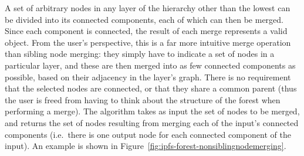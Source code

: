 A set of arbitrary nodes in any layer of the hierarchy other than the lowest can be divided into its connected components, each of which can then be merged. Since each component is connected, the result of each merge represents a valid object. From the user's perspective, this is a far more intuitive merge operation than sibling node merging: they simply have to indicate a set of nodes in a particular layer, and these are then merged into as few connected components as possible, based on their adjacency in the layer's graph. There is no requirement that the selected nodes are connected, or that they share a common parent (thus the user is freed from having to think about the structure of the forest when performing a merge). The algorithm takes as input the set of nodes to be merged, and returns the set of nodes resulting from merging each of the input's connected components (i.e.~there is one output node for each connected component of the input). An example is shown in Figure~\ref{fig:ipfs-forest-nonsiblingnodemerging}.

